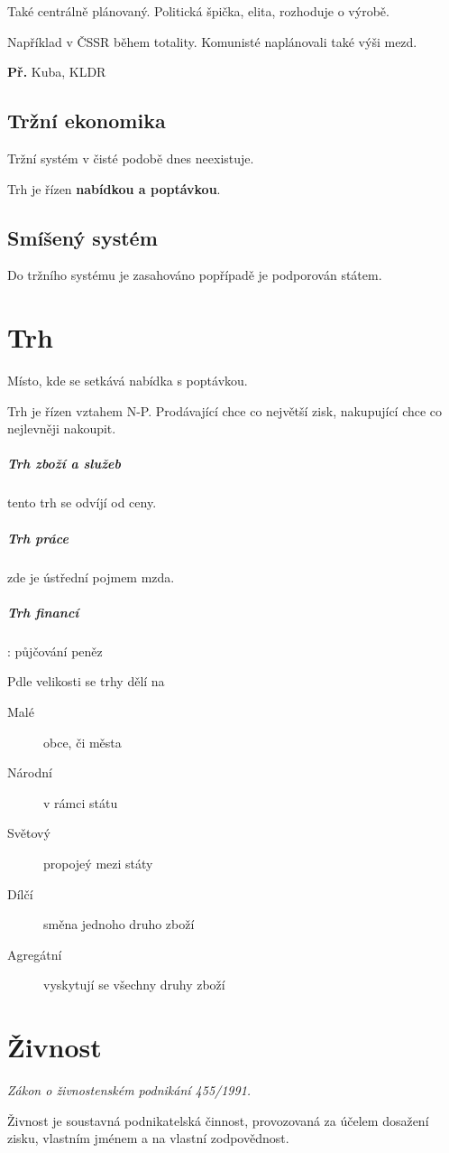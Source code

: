 \documentclass[10pt,a4paper,
twoside,%
]{report}
\begin{document}
Také centrálně plánovaný. Politická špička, elita, rozhoduje o výrobě.

Například v ČSSR během totality. Komunisté naplánovali také výši mezd.

\textbf{Př.} Kuba, KLDR

\subsection{Tržní ekonomika}

Tržní systém v čisté podobě dnes neexistuje.

Trh je řízen \textbf{nabídkou a poptávkou}. 

\subsection{Smíšený systém}

Do tržního systému je zasahováno popřípadě je podporován státem.

\section{Trh}
\textsf{Místo, kde se setkává nabídka s poptávkou.}

Trh je řízen vztahem N-P. Prodávající chce co největší zisk, nakupující chce co nejlevněji nakoupit.

\subparagraph{Trh zboží a služeb} tento trh se odvíjí od ceny.

\subparagraph{Trh práce} zde je ústřední pojmem mzda.

\subparagraph{Trh financí}: půjčování peněz

Pdle velikosti se trhy dělí na 
\begin{description}
\item[Malé] obce, či města
\item[Národní] v rámci státu
\item[Světový] propojeý mezi státy
\item[Dílčí] směna jednoho druho zboží
\item[Agregátní] vyskytují se všechny druhy zboží
\end{description}

\section{Živnost}

\emph{Zákon o živnostenském podnikání 455/1991.}

Živnost je soustavná podnikatelská činnost, provozovaná za účelem dosažení zisku,  vlastním jménem a na vlastní zodpovědnost.
\end{document}
